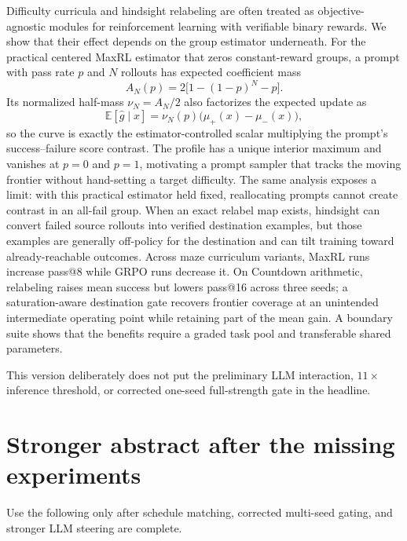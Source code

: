 \documentclass[11pt]{article}
\newcommand{\E}{\mathbb{E}}
\theoremstyle{definition}
\theoremstyle{remark}
\begin{document}
\begin{rewritebox}[title={\textbf{Conservative abstract---ready to paste}}]
Difficulty curricula and hindsight relabeling are often treated as objective-agnostic modules for reinforcement learning with verifiable binary rewards. We show that their effect depends on the group estimator underneath. For the practical centered MaxRL estimator that zeros constant-reward groups, a prompt with pass rate $p$ and $N$ rollouts has expected coefficient mass
\[
A_N(p)=2\bigl[1-(1-p)^N-p\bigr].
\]
Its normalized half-mass $\nu_N=A_N/2$ also factorizes the expected update as
\[
\E[\widehat g\mid x]=\nu_N(p)\bigl(\mu_+(x)-\mu_-(x)\bigr),
\]
so the curve is exactly the estimator-controlled scalar multiplying the prompt's success--failure score contrast. The profile has a unique interior maximum and vanishes at $p=0$ and $p=1$, motivating a prompt sampler that tracks the moving frontier without hand-setting a target difficulty. The same analysis exposes a limit: with this practical estimator held fixed, reallocating prompts cannot create contrast in an all-fail group. When an exact relabel map exists, hindsight can convert failed source rollouts into verified destination examples, but those examples are generally off-policy for the destination and can tilt training toward already-reachable outcomes. Across maze curriculum variants, MaxRL runs increase pass@8 while GRPO runs decrease it. On Countdown arithmetic, relabeling raises mean success but lowers pass@16 across three seeds; a saturation-aware destination gate recovers frontier coverage at an unintended intermediate operating point while retaining part of the mean gain. A boundary suite shows that the benefits require a graded task pool and transferable shared parameters.
\end{rewritebox}

This version deliberately does not put the preliminary LLM interaction, $11\times$ inference threshold, or corrected one-seed full-strength gate in the headline.

\section{Stronger abstract after the missing experiments}

Use the following only after schedule matching, corrected multi-seed gating, and stronger LLM steering are complete.
\end{document}
